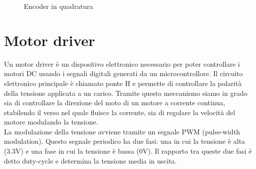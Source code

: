 \begin{figure}[H]
\hfill
{}
\hfill
{}
\hfill
\caption{Encoder in quadratura}
\end{figure}

\section{Motor driver}
Un motor driver è un dispositivo elettronico necessario per poter controllare i motori DC usando i segnali digitali generati da un microcontrollore.
Il circuito elettronico principale è chiamato ponte H e permette di controllare la polarità della tensione applicata a un carico. Tramite questo meccanismo siamo in grado sia di controllare la direzione del moto di un motore a corrente continua, stabilendo il verso nel quale fluisce la corrente, sia di regolare la velocità del motore modulando la tensione. \\
La modulazione della tensione avviene tramite un segnale PWM (pulse-width modulation). Questo segnale periodico ha due fasi: una in cui la tensione è alta (3.3V) e una fase in cui la tensione è bassa (0V). Il rapporto tra queste due fasi è detto duty-cycle e determina la tensione media in uscita.

